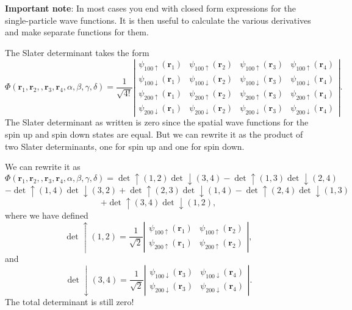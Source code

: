 \documentclass[graybox,sectrefs,envcountresetchap,open=right]{svmonodo}
\begin{document}
\textbf{Important note}: In most cases you end with closed form expressions for the single-particle  wave functions. It is then useful to calculate the various derivatives and make separate functions
for them.





The Slater determinant takes the form  
\[
   \Phi(\mathbf{r}_1,\mathbf{r}_2,,\mathbf{r}_3,\mathbf{r}_4, \alpha,\beta,\gamma,\delta)=\frac{1}{\sqrt{4!}}
\left| \begin{array}{cccc} \psi_{100\uparrow}(\mathbf{r}_1)& \psi_{100\uparrow}(\mathbf{r}_2)& \psi_{100\uparrow}(\mathbf{r}_3)&\psi_{100\uparrow}(\mathbf{r}_4) \\
\psi_{100\downarrow}(\mathbf{r}_1)& \psi_{100\downarrow}(\mathbf{r}_2)& \psi_{100\downarrow}(\mathbf{r}_3)&\psi_{100\downarrow}(\mathbf{r}_4) \\
\psi_{200\uparrow}(\mathbf{r}_1)& \psi_{200\uparrow}(\mathbf{r}_2)& \psi_{200\uparrow}(\mathbf{r}_3)&\psi_{200\uparrow}(\mathbf{r}_4) \\
\psi_{200\downarrow}(\mathbf{r}_1)& \psi_{200\downarrow}(\mathbf{r}_2)& \psi_{200\downarrow}(\mathbf{r}_3)&\psi_{200\downarrow}(\mathbf{r}_4) \end{array} \right|.
\]
The Slater determinant as written is zero since the spatial wave functions for the spin up and spin down 
states are equal.  
But we can rewrite it as the product of two Slater determinants, one for spin up and one for spin down.



We can rewrite it as 
\[
   \Phi(\mathbf{r}_1,\mathbf{r}_2,,\mathbf{r}_3,\mathbf{r}_4, \alpha,\beta,\gamma,\delta)=\det\uparrow(1,2)\det\downarrow(3,4)-\det\uparrow(1,3)\det\downarrow(2,4)
\]
\[
-\det\uparrow(1,4)\det\downarrow(3,2)+\det\uparrow(2,3)\det\downarrow(1,4)-\det\uparrow(2,4)\det\downarrow(1,3)
\]
\[
+\det\uparrow(3,4)\det\downarrow(1,2),
\]
where we have defined
\[
\det\uparrow(1,2)=\frac{1}{\sqrt{2}}\left| \begin{array}{cc} \psi_{100\uparrow}(\mathbf{r}_1)& \psi_{100\uparrow}(\mathbf{r}_2)\\
\psi_{200\uparrow}(\mathbf{r}_1)& \psi_{200\uparrow}(\mathbf{r}_2) \end{array} \right|,
\]
and 
\[
\det\downarrow(3,4)=\frac{1}{\sqrt{2}}\left| \begin{array}{cc} \psi_{100\downarrow}(\mathbf{r}_3)& \psi_{100\downarrow}(\mathbf{r}_4)\\
\psi_{200\downarrow}(\mathbf{r}_3)& \psi_{200\downarrow}(\mathbf{r}_4) \end{array} \right|.
\]
The total determinant is still zero!
\end{document}
